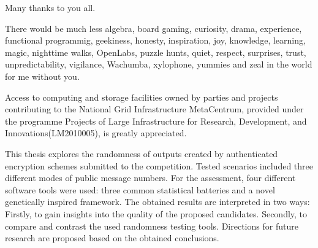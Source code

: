 \documentclass[12pt]{fithesis2}
\begin{document}
\FrontMatter
\ThesisTitlePage

\begin{ThesisDeclaration}
\DeclarationText
\AdvisorName
\end{ThesisDeclaration}

\begin{ThesisThanks}
Many thanks to you all.

\vspace{1em}
\noindent
There would be much less
algebra,        %
board gaming,   %
curiosity,      %
drama,          %
experience,     %
functional programmig,  %
geekiness,      %
honesty,        %
inspiration,    %
joy,            %
knowledge,      %
learning,       %
magic,          %
nighttime walks,    %
OpenLabs,       %
puzzle hunts,   %
quiet,          %
respect,        %
surprises,      %
trust,          %
unpredictability,   %
vigilance,      %
Wachumba,       %
xylophone,      %
yummies         %
and
zeal            %
in the world for me without you.

\vspace{0.65\textheight}
\noindent
Access to computing and storage facilities owned by parties and projects contributing to the National Grid Infrastructure MetaCentrum, provided under the programme Projects of Large Infrastructure for Research, Development, and Innovations(LM2010005), is greatly appreciated.
\end{ThesisThanks}

\begin{ThesisAbstract}
This thesis explores the randomness of outputs created by authenticated encryption schemes submitted to the  competition. Tested scenarios included three different modes of public message numbers. For the assessment, four different software tools were used: three common statistical batteries and a novel genetically inspired framework. The obtained results are interpreted in two ways: Firstly, to gain insights into the quality of the proposed  candidates. Secondly, to compare and contrast the used randomness testing tools. Directions for future research are proposed based on the obtained conclusions.
\end{ThesisAbstract}
\end{document}
